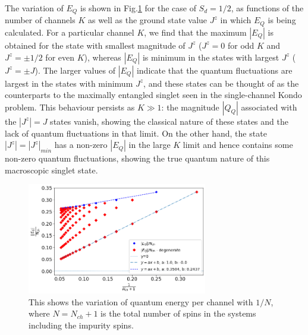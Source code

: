 \documentclass[reprint,onecolumn,prb,superscriptaddress]{revtex4-2}
\begin{document}
The variation of \(E_Q\) is shown in Fig.\ref{fig:quantum_energy} for the case of $S_d=1/2$, as functions of the number of channels \(K\) as well as the ground state value \(J^z\) in which \(E_Q\) is being calculated. For a particular channel $K$, we find that the maximum \(|E_Q|\) is obtained for the state with smallest magnitude of $J^z$ (\(J^z = 0 \) for odd \(K\) and \(J^z = \pm 1/2\) for even \(K\)), whereas \(|E_Q|\) is minimum in the states with largest \(J^z\) ($J^z=\pm J$). The larger values of \(|E_Q|\) indicate that the quantum fluctuations are largest in the states with minimum \(J^z\), and these states can be thought of as the counterparts to the maximally entangled singlet seen in the single-channel Kondo problem. This behaviour persists as \(K \gg 1\): the magnitude \(|Q_Q|\) associated with the $|J^z|= J$ states vanish, showing the classical nature of these states and the lack of quantum fluctuations in that limit. On the other hand, the state $|J^z| = |J^z|_{min}$ has a non-zero \(|E_Q|\) in the large \(K\) limit and hence contains some non-zero quantum fluctuations, showing the true quantum nature of this macroscopic singlet state.

\begin{figure}[!htb]
\centering
\includegraphics[width=0.7\textwidth]{QuantumEnergyperchannel}
\caption{This shows the variation of quantum energy per channel with $1/N$, where $N=N_{ch}+1$ is the total number of spins in the systems including the impurity spins.}
\label{fig:quantum_energy}
\end{figure}
\end{document}

